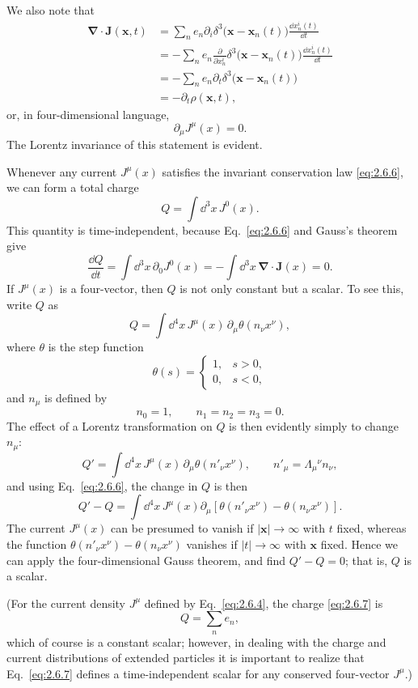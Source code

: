 We also note that
\[
\begin{aligned}
  \boldsymbol{\nabla}\cdot\mathbf J(\mathbf x,t)
  &=\sum_n e_n
    \partial_i
    \delta^3\bigl(\mathbf x-\mathbf x_n(t)\bigr)
    \frac{\dd x_n^i(t)}{\dd t}\\
  &=-\sum_n e_n
    \frac{\partial}{\partial x_n^i}
    \delta^3\bigl(\mathbf x-\mathbf x_n(t)\bigr)
    \frac{\dd x_n^i(t)}{\dd t}\\
  &=-\sum_n e_n\partial_t
    \delta^3\bigl(\mathbf x-\mathbf x_n(t)\bigr)\\
  &=-\partial_t\rho(\mathbf x,t),
\end{aligned}
\]
or, in four-dimensional language,
\begin{equation}
  \partial_\mu J^\mu(x)=0.
  \tag{2.6.6}\label{eq:2.6.6}
\end{equation}
The Lorentz invariance of this statement is evident.

Whenever any current \(J^\mu(x)\) satisfies the invariant conservation law
\eqref{eq:2.6.6}, we can form a total charge
\begin{equation}
  Q=\int \dd^3x\,J^0(x).
  \tag{2.6.7}\label{eq:2.6.7}
\end{equation}
This quantity is time-independent, because Eq.~\eqref{eq:2.6.6} and Gauss's
theorem give
\[
  \frac{\dd Q}{\dd t}
  =\int \dd^3x\,\partial_0J^0(x)
  =-\int \dd^3x\,\boldsymbol{\nabla}\cdot\mathbf J(x)=0 .
\]
If \(J^\mu(x)\) is a four-vector, then \(Q\) is not only constant but a
scalar. To see this, write \(Q\) as
\begin{equation}
  Q=\int \dd^4x\,J^\mu(x)\,
  \partial_\mu\theta(n_\nu x^\nu),
  \tag{2.6.8}\label{eq:2.6.8}
\end{equation}
where \(\theta\) is the step function
\[
  \theta(s)=
  \begin{cases}
    1,&s>0,\\
    0,&s<0,
  \end{cases}
\]
and \(n_\mu\) is defined by
\[
  n_0=1,\qquad n_1=n_2=n_3=0 .
\]
The effect of a Lorentz transformation on \(Q\) is then evidently simply to
change \(n_\mu\):
\[
  Q'=\int \dd^4x\,J^\mu(x)\,
  \partial_\mu\theta(n'_\nu x^\nu),
  \qquad
  n'_\mu=\Lambda_\mu{}^\nu n_\nu ,
\]
and using Eq.~\eqref{eq:2.6.6}, the change in \(Q\) is then
\[
  Q'-Q
  =\int \dd^4x\,J^\mu(x)\partial_\mu
  \left[
    \theta(n'_\nu x^\nu)-\theta(n_\nu x^\nu)
  \right].
\]
The current \(J^\mu(x)\) can be presumed to vanish if
\(\lvert\mathbf x\rvert\to\infty\) with \(t\) fixed, whereas the function
\(\theta(n'_\nu x^\nu)-\theta(n_\nu x^\nu)\) vanishes if
\(\lvert t\rvert\to\infty\) with \(\mathbf x\) fixed. Hence we can apply the
four-dimensional Gauss theorem, and find \(Q'-Q=0\); that is, \(Q\) is a
scalar.

(For the current density \(J^\mu\) defined by Eq.~\eqref{eq:2.6.4}, the
charge \eqref{eq:2.6.7} is
\[
  Q=\sum_n e_n ,
\]
which of course is a constant scalar; however, in dealing with the charge and
current distributions of extended particles it is important to realize that
Eq.~\eqref{eq:2.6.7} defines a time-independent scalar for any conserved
four-vector \(J^\mu\).)
